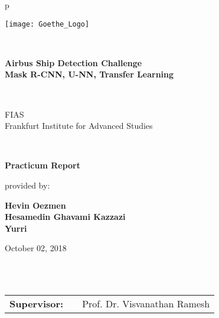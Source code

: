 \begin{center}
\begin{tabular}{p{\textwidth}}

\begin{center}
\texttt{[image: Goethe\_Logo]}
\end{center}

\\
\nocite{*}
\begin{center}
\LARGE{\textbf{Airbus Ship Detection Challenge \\
Mask R-CNN, U-NN, Transfer Learning}}
\end{center}

\\


\begin{center}
\large{FIAS \\
Frankfurt Institute for Advanced Studies \\}
\end{center}

\\

\begin{center}
\textbf{\Large{Practicum Report}}
\end{center}


\begin{center}
provided by:
\end{center}

\begin{center}
\large{\textbf{Hevin Oezmen \\
Hesamedin Ghavami Kazzazi \\
Yurri}} \\
\end{center}

\begin{center}
\large{October 02, 2018}
\end{center}

\\

\\

\begin{center}
\begin{tabular}{lll}
\textbf{Supervisor:} & & Prof. Dr. Visvanathan Ramesh\\
\end{tabular}
\end{center}

\end{tabular}
\end{center}